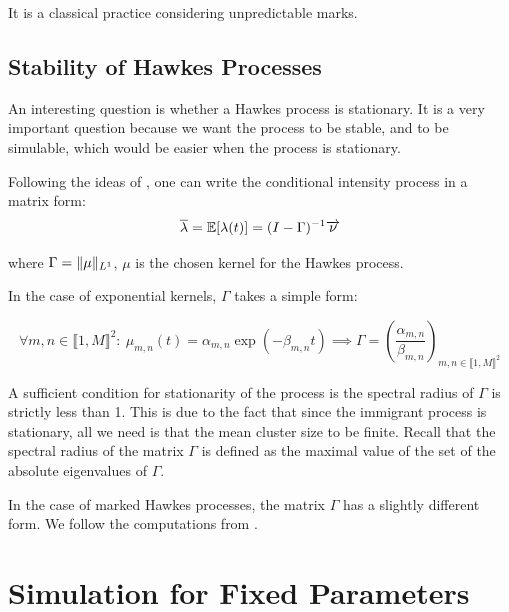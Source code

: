 It is a classical practice considering unpredictable marks. 



\subsection{Stability of Hawkes Processes}


An interesting question is whether a Hawkes process is stationary. It is a very important question because we want the process to be stable, and to be simulable, which would be easier when the process is stationary.

Following the ideas of \cite{Hawkes}, one can write the conditional intensity process in a matrix form:
\begin{equation}
\overline{\lambda} = \mathbb E [ \lambda(t) ] = (I - \Gamma) ^{-1}\overrightarrow{\nu}  
\end{equation}

where $ \Gamma = \lVert \mu\rVert_{L^1} $,  $\mu$ is the chosen kernel for the Hawkes process.
 
In the case of exponential kernels, $\Gamma$ takes a simple form:

\begin{equation}
\forall m,n \in \llbracket 1, M \rrbracket^2: \  \mu_{m,n} (t) = \alpha_{m,n} \exp ( - \beta_{m,n} t ) \implies \Gamma = \left ( \frac{ \alpha_{m,n} } { \beta_{m,n} } \right )_{ m,n \in \llbracket 1, M \rrbracket^2} 
\end{equation}

A sufficient condition for stationarity of the process is the spectral radius of $\Gamma$ is strictly less than 1. This is due to the fact that since the immigrant process is stationary, all we need is that the mean cluster size to be finite. Recall that the spectral radius of the matrix $\Gamma$ is defined as the maximal value of the set of the absolute eigenvalues of $\Gamma$.

In the case of marked Hawkes processes, the matrix $\Gamma$ has a slightly different form. We follow the computations from \cite{my_algo_simul}.



\section{Simulation for Fixed Parameters}
